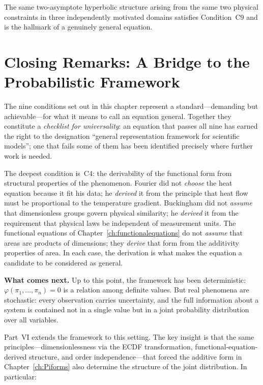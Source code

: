 \noindent
The same two-asymptote hyperbolic structure arising from the same
two physical constraints in three independently motivated domains
satisfies Condition~C9 and is the hallmark of a genuinely general
equation.

\section{Closing Remarks: A Bridge to the Probabilistic Framework}
\label{sec:ucq:closing}

The nine conditions set out in this chapter represent a
standard---demanding but achievable---for what it means to call an
equation general.  Together they constitute a
\emph{checklist for universality}: an equation that passes all
nine has earned the right to the designation ``general representation framework for scientific models''; one that fails some of them has been identified
precisely where further work is needed.

The deepest condition is~C4: the derivability of the functional
form from structural properties of the phenomenon.  Fourier did
not \emph{choose} the heat equation because it fit his data; he
\emph{derived} it from the principle that heat flow must be
proportional to the temperature gradient.  Buckingham did not
\emph{assume} that dimensionless groups govern physical similarity;
he \emph{derived} it from the requirement that physical laws be
independent of measurement units.  The functional equations of
Chapter~\ref{ch:functionalequations} do not \emph{assume} that areas
are products of dimensions; they \emph{derive} that form from the
additivity properties of area.  In each case, the derivation is
what makes the equation a candidate to be considered as general.

\medskip

\noindent
\textbf{What comes next.}  Up to this point, the framework has
been deterministic: $\varphi(\pi_1,\ldots,\pi_n)=0$ is a
relation among definite values.  But real phenomena are
stochastic: every observation carries uncertainty, and the full
information about a system is contained not in a single value but
in a joint probability distribution over all variables.

Part~VI extends the framework to this setting.  The key insight is
that the same principles---dimensionlessness via the ECDF
transformation, functional-equation-derived structure, and order
independence---that forced the additive form in
Chapter~\ref{ch:Piforms} also determine the structure of the joint
distribution.  In particular:

